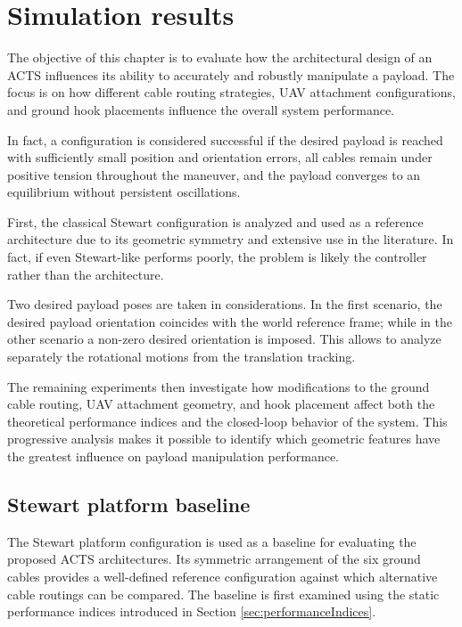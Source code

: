 \chapter{Simulation results}
\label{chap:results}

The objective of this chapter is to evaluate how the architectural design of an ACTS influences its ability to accurately and robustly manipulate a payload. The focus is on how different cable routing strategies, UAV attachment configurations, and ground hook placements influence the overall system performance.

In fact, a configuration is considered successful if the desired payload is reached with sufficiently small position and orientation errors, all cables remain under positive tension throughout the maneuver, and the payload converges to an equilibrium without persistent oscillations.

First, the classical Stewart configuration is analyzed and used as a reference architecture due to its geometric symmetry and extensive use in the literature. In fact, if even Stewart-like performs poorly, the problem is likely the controller rather than the architecture. 

Two desired payload poses are taken in considerations. In the first scenario, the desired payload orientation coincides with the world reference frame; while in the other scenario a non-zero desired orientation is imposed. This allows to analyze separately the rotational motions from the translation tracking.

The remaining experiments then investigate how modifications to the ground cable routing, UAV attachment geometry, and hook placement affect both the theoretical performance indices and the closed-loop behavior of the system. This progressive analysis makes it possible to identify which geometric features have the greatest influence on payload manipulation performance.

\section{Stewart platform baseline}
The Stewart platform configuration is used as a baseline for evaluating the proposed ACTS architectures. Its symmetric arrangement of the six ground cables provides a well-defined reference configuration against which alternative cable routings can be compared. The baseline is first examined using the static performance indices introduced in Section \ref{sec:performanceIndices}. 

